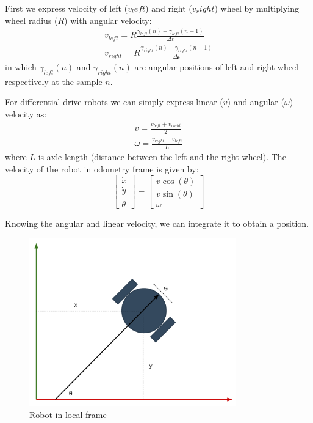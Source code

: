 First we express velocity of left ($v_left$) and right ($v_right$) wheel by multiplying wheel radius ($R$) with angular velocity:
\begin{equation}
\begin{aligned}
    v_{left} = R \frac{\gamma_{left}(n) - \gamma_{left}(n-1)}{\Delta t} \\
    v_{right} = R \frac{\gamma_{right}(n) - \gamma_{right}(n-1)}{\Delta t}
\end{aligned}
\end{equation}
in which $ \gamma_{left}(n) $ and $ \gamma_{right}(n) $ are angular positions of left and right wheel respectively at the sample $ n $.

For differential drive robots we can simply express linear ($v$) and angular ($\omega$) velocity as:
\begin{equation}
\begin{aligned}
    v = \frac{v_{left} + v_{right}}{2}  \\
    \omega = \frac{v_{right} - v_{left}}{L}
\end{aligned}
\end{equation}
where $ L $ is axle length (distance between the left and the right wheel). The velocity of the robot in odometry frame is given by:
\begin{equation}
\begin{bmatrix}
\dot{x} \\
\dot{y} \\
\dot{\theta}
\end{bmatrix} = \begin{bmatrix}
v \cos(\theta) \\
v \sin(\theta) \\
\omega
\end{bmatrix}
\end{equation}

Knowing the angular and linear velocity, we can integrate it to obtain a position.

\begin{figure}[H]
    \centering
    \includegraphics[width=0.8\textwidth]{simulation/figures/odometry.pdf}
    \caption{Robot in local frame \cite{noauthor_16-311_nodate}}
    \label{fig:simulation:odometry_schema}
\end{figure}

